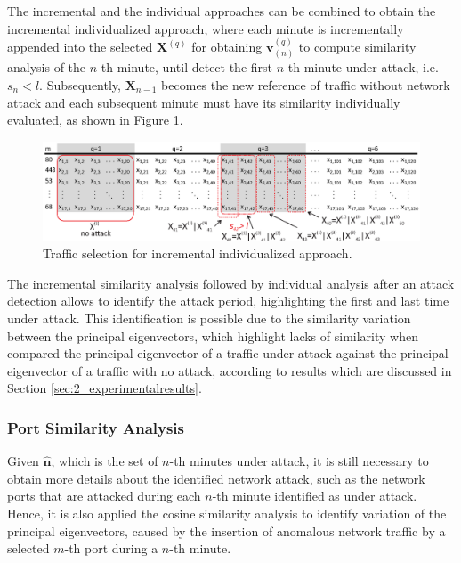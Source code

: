 The incremental and the individual approaches can be combined to obtain the incremental individualized approach, where each minute is incrementally appended into the selected $\pmb{X}^{(q)}$ for obtaining $\pmb{v}_{(n)}^{(q)}$ to compute similarity analysis of the $n$-th minute, until detect the first $n$-th minute under attack, i.e. $s_n < l$. Subsequently, $\pmb{X}_{n-1}$ becomes the new reference of traffic without network attack and each subsequent minute must have its similarity individually evaluated, as shown in Figure \ref{fig:2.22}.

\begin{figure}[h!]
     \includegraphics[width=15cm]{figures/ch2/incremental_individualized.eps}
     \caption{Traffic selection for incremental individualized approach.}
     \label{fig:2.22}
\end{figure}

The incremental similarity analysis followed by individual analysis after an attack detection allows to identify the attack period, highlighting the first and last time under attack. This identification is possible due to the similarity variation between the principal eigenvectors, which highlight lacks of similarity when compared the principal eigenvector of a traffic under attack against the principal eigenvector of a traffic with no attack, according to results which are discussed in Section \ref{sec:2_experimentalresults}.

\subsubsection{Port Similarity Analysis}
\label{sec:2_prop_PortSimilarityAnalysis}

Given $\hat{\pmb{n}}$, which is the set of $n$-th minutes under attack, it is still necessary to obtain more details about the identified network attack, such as the network ports that are attacked during each $n$-th minute identified as under attack. Hence, it is also applied the cosine similarity analysis to identify variation of the principal eigenvectors, caused by the insertion of anomalous network traffic by a selected $m$-th port during a $n$-th minute. 

